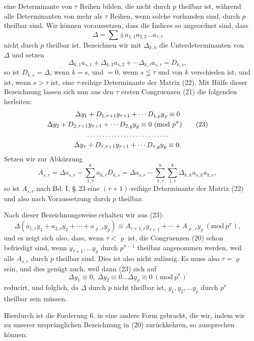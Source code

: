eine Determinante von $\tau$ Reihen bilden, die nicht durch $p$ theilbar ist, während alle Determinanten von mehr als $\tau$ Reihen,
wenn solche vorhanden sind, durch $p$ theilbar sind. Wir können
voraussetzen, dass die Indices so angeordnet sind, dass
\[
\Delta = \sum \pm a_{1,1}a_{2,2} \dots a_{\tau,\tau}
\]
nicht durch $p$ theilbar ist. Bezeichnen wir mit $\Delta_{k,h}$ die Unterdeterminanten von $\Delta$ und setzen
\[
\Delta_{k,1}a_{s,1} + \Delta_{k,2}a_{s,2} + \cdots \Delta_{k,\tau}a_{s,\tau} = D_{k,s},
\]
so ist $D_{k,s} = \Delta$, wenn $k = s$, und $= 0$, wenn $s \leqq \tau$ und von
$k$ verschieden ist, und ist, wenn $s > \tau$ ist, eine $\tau$-reihige Determinante der Matrix (22). Mit Hülfe dieser Bezeichnung lassen
sich nun aus den $\tau$ ersten Congruenzen (21) die folgenden herleiten:
\begin{gather}
\Delta y_1 + D_{1,\tau+1}y_{\tau+1} + \cdots D_{1,\varrho}y_\varrho \equiv 0 \notag\\
\Delta y_2 + D_{2,\tau+1}y_{\tau+1} + \cdots D_{2,\varrho}y_\varrho \equiv 0\ (\mathrm{mod}\ p^\pi) \tag{23}\\
\dots\dots\dots\dots\dots\dots\dots\dots\dots \notag\\
\Delta y_\tau + D_{\tau,\tau+1}y_{\tau+1} + \cdots D_{\tau,\varrho}y_\varrho \equiv 0. \notag
\end{gather}
Setzen wir zur Abkürzung
\[
A_{s,r} = \Delta a_{s,r} - \sum_{1,\tau}^{k} a_{k,r}D_{k,s} = \Delta a_{s,r} - \sum_{1,\tau}^{h}\sum_{1,\tau}^{k} \Delta_{k,h}a_{s,h}a_{k,r},
\]
so ist $A_{s,r}$ nach Bd. I, \S.\,23 eine $(\tau+1)$-reihige Determinante der
Matrix (22) und also nach Voraussetzung durch $p$ theilbar.

    Nach dieser Bezeichnungsweise erhalten wir aus (23):
\[
\Delta (a_{1,r}y_1 + a_{2,r}y_2 + \cdots + a_{\varrho,r}y_\varrho)
\equiv A_{\tau+1,r}y_{\tau+1} + \cdots + A_{\varrho,r}y_\varrho\ (\mathrm{mod}\ p^\pi),
\]
und es zeigt sich also, dass, wenn $\tau < \varrho$ ist, die Congruenzen (20)
schon befriedigt sind, wenn $y_{\tau+1}, \dots y_\varrho$ durch $p^{\pi-1}$ theilbar angenommen werden, weil alle $A_{s,r}$ durch $p$ theilbar sind. Dies
ist also nicht zulässig. Es muss also $\tau = \varrho$ sein, und dies genügt
auch, weil dann (23) sich auf
\[
\Delta y_1 \equiv 0,\ \Delta y_2 \equiv 0 \dots \Delta y_\varrho \equiv 0\ (\mathrm{mod}\ p^\pi)
\]
reducirt, und folglich, da $\Delta$ durch $p$ nicht theilbar ist, $y_1, y_2, \dots y_\varrho$
durch $p^\pi$ theilbar sein müssen.

    Hierdurch ist die Forderung 6. in eine andere Form gebracht, die wir, indem wir zu unserer ursprünglichen Bezeichnung
in (20) zurückkehren, so aussprechen können:
